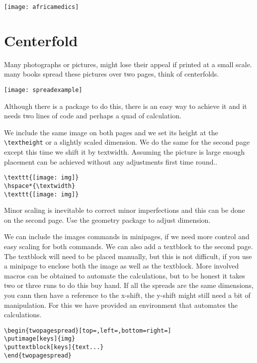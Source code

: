 \hspace*{-\textwidth} \texttt{[image: africamedics]}

\restoregeometry

\chapter{Centerfold}
Many photographs or pictures, might lose their appeal if printed at a small scale. many books spread these pictures over two pages, think of centerfolds.
\smallskip

\texttt{[image: spreadexample]}

\smallskip

Although there is a package to do this, there is an easy way to achieve it and it needs two lines of code and perhaps a quad of calculation.


We include the same image on both pages and we set its height at the \verb!\textheight! or a slightly scaled dimension. We do the same for the second page except this time we shift it by textwidth. Assuming the picture is large enough placement can be achieved without any adjustments first time round..

{\footnotesize
\begin{verbatim}
\texttt{[image: img]}
\hspace*{\textwidth}
\texttt{[image: img]}
\end{verbatim}}

Minor scaling is inevitable to correct minor imperfections and this can be done on the second page.
Use the geometry package to adjust dimension.




We can include the images commands in minipages, if we need more control and easy scaling for both commands. We can also add a textblock to the second page. The textblock will need to be placed manually, but this is not difficult, if you use a minipage to enclose both the image as well as the textblock.
More involved macros can be obtained to automate the calculations, but to be honest it takes two or three runs to do this buy hand. If all the spreads are the same dimensions, you cann then have a reference to the x-shift, the y-shift might still need a bit of manipulation. For this we have provided an environment that automates the calculations.
\begin{verbatim}
\begin{twopagespread}[top=,left=,bottom=right=]
\putimage[keys]{img}
\puttextblock[keys]{text...}
\end{twopagespread}
\end{verbatim}





